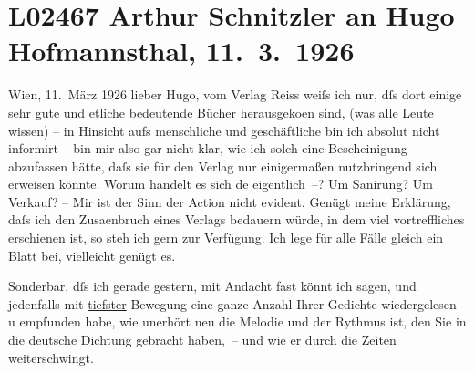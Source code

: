 

\section[Arthur Schnitzler an Hugo Hofmannsthal, 11. 3. 1926]{L02467 Arthur Schnitzler an Hugo Hofmannsthal, 11. 3. 1926}
\nopagebreak{}
\rehead{ }\normalsize\beginnumbering{}
\toendnotes[C]{\smallbreak\pagebreak[2]}
\pstart
           \raggedleft{}{\pb}Wien, 11. März 1926\pend
           \vspace{0.5em}
\pstart
           lieber Hugo, vom Verlag Reiss
               weiſs ich nur, dſs dort einige sehr gute und etliche bedeutende Bücher herausgeko{\geminationm}en sind, (was alle Leute wissen) – \introOben{}in Hinsicht aufs\introOben{} menschliche und geschäftliche bin ich absolut nicht
               informirt – bin mir also gar nicht klar, wie ich solch eine Bescheinigung abzufassen
               hätte, daſs sie für den Verlag nur einigermaßen nutzbringend sich erweisen könnte.
               Worum handelt es sich de{\geminationn} eigentlich –? Um Sanirung? Um
               Verkauf? – Mir ist der Sinn der Action nicht evident. Genügt meine Erklärung, daſs
               ich den Zusa{\geminationm}enbruch eines Verlags bedauern würde, in
               dem viel vortreffliches erschienen ist, so steh ich gern zur Verfügung. Ich lege für
               alle Fälle gleich ein Blatt bei, vielleicht genügt es.\pend
           
\pstart
           {\pb}Sonderbar, dſs ich gerade gestern, mit Andacht fast
               könnt ich sagen, und jedenfalls mit \uline{tiefster} Bewegung
               eine ganze Anzahl Ihrer Gedichte \introOben{}wieder\introOben{}gelesen u empfunden
               habe, wie unerhört neu die Melodie und der Rythmus ist, den Sie in die deutsche
               Dichtung gebracht haben, – und wie er durch die Zeiten weiterschwingt.\pend
           
